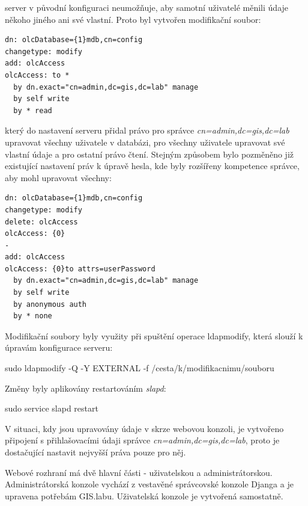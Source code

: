  server v původní konfiguraci neumožňuje, aby samotní
uživatelé měnili údaje někoho jiného ani své vlastní. Proto byl
vytvořen modifikační soubor:

\begin{verbatim}
dn: olcDatabase={1}mdb,cn=config
changetype: modify
add: olcAccess
olcAccess: to * 
  by dn.exact="cn=admin,dc=gis,dc=lab" manage  
  by self write  
  by * read
\end{verbatim}

který do nastavení serveru přidal právo pro správce
\textit{cn=admin,dc=gis,dc=lab} upravovat všechny uživatele v
databázi, pro všechny uživatele upravovat své vlastní údaje a pro
ostatní právo čtení. Stejným způsobem bylo pozměněno již existující
nastavení práv k úpravě hesla, kde byly rozšířeny kompetence správce,
aby mohl upravovat všechny:

\begin{verbatim}
dn: olcDatabase={1}mdb,cn=config
changetype: modify
delete: olcAccess
olcAccess: {0}
-
add: olcAccess
olcAccess: {0}to attrs=userPassword
  by dn.exact="cn=admin,dc=gis,dc=lab" manage
  by self write
  by anonymous auth
  by * none
\end{verbatim}

Modifikační soubory byly využity při spuštění operace ldapmodify,
která slouží k úpravám konfigurace  serveru:
\begin{center}
\textsf{sudo ldapmodify -Q -Y EXTERNAL -f /cesta/k/modifikacnimu/souboru}
\end{center}

Změny byly aplikovány restartováním \textit{slapd}:
\begin{center}
\textsf{sudo service slapd restart}
\end{center}

V situaci, kdy jsou upravovány údaje v  skrze webovou
konzoli, je vytvořeno připojení s přihlašovacími údaji správce
\textit{cn=admin,dc=gis,dc=lab}, proto je dostačující nastavit
nejvyšší práva pouze pro něj.

Webové rozhraní má dvě hlavní části - uživatelskou a
administrátorskou. Administrátorská konzole vychází z vestavěné
správcovské konzole Djanga a je upravena potřebám
GIS.labu. Uživatelská konzole je vytvořená samostatně.

\newpage
